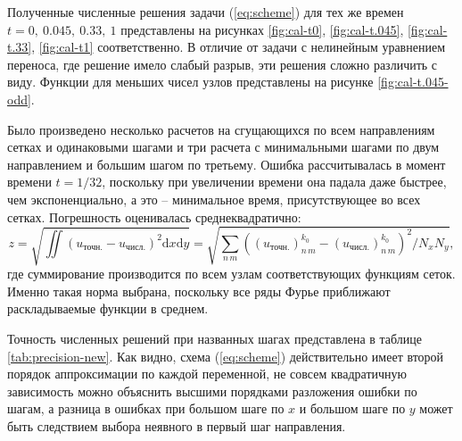 \documentclass[a4paper,12pt]{article}
\def\mysection#1{\vspace{\baselineskip}{\noindent\large\centering\bf#1\par}}
\def\d{\mathrm{d}}
\begin{document}
Полученные численные решения задачи (\ref{eq:scheme}) для тех же времен  $t=0,\ 0.045,\ 0.33,\ 1$ представлены на рисунках \ref{fig:cal-t0}, \ref{fig:cal-t.045}, \ref{fig:cal-t.33}, \ref{fig:cal-t1} соответственно. В отличие от задачи с нелинейным уравнением переноса, где решение имело слабый разрыв, эти решения сложно различить с виду. Функции для меньших чисел узлов представлены на рисунке \ref{fig:cal-t.045-odd}.

\mysection{Точность решения}
Было произведено несколько расчетов на сгущающихся по всем направлениям сетках и одинаковыми шагами и три расчета с минимальными шагами по двум направлением и большим шагом по третьему. Ошибка рассчитывалась в момент времени $t=1/32$, поскольку при увеличении времени она падала даже быстрее, чем экспоненциально, а это -- минимальное время, присутствующее во всех сетках. Погрешность оценивалась среднеквадратично: 
$$z=\sqrt{\iint (u_\text{точн.}-u_\text{числ.})^2\d x\d y}=\sqrt{\sum\limits_{n\,m}\left((u_\text{точн.})_{n\,m}^{k_0}-(u_\text{числ.})_{n\,m}^{k_0}\right)^2/N_xN_y},$$
где суммирование производится по всем узлам соответствующих функциям сеток. Именно такая норма выбрана, поскольку все ряды Фурье приближают раскладываемые функции в среднем. 

Точность численных решений при названных шагах представлена в таблице \ref{tab:precision-new}. Как видно, схема (\ref{eq:scheme}) действительно имеет второй порядок аппроксимации по каждой переменной, не совсем квадратичную зависимость можно объяснить высшими порядками разложения ошибки по шагам, а разница в ошибках при большом шаге по $x$ и большом шаге по $y$ может быть следствием выбора неявного в первый шаг направления. 




\end{document}
